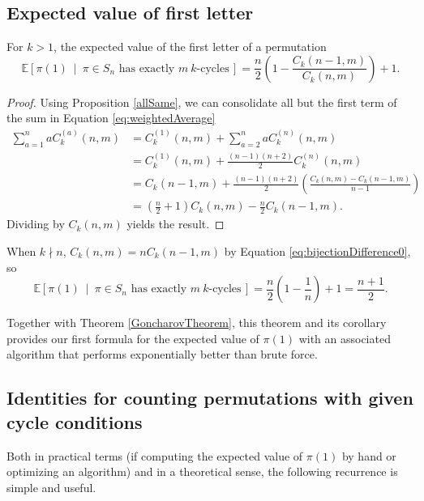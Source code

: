 \subsection{Expected value of first letter}
\begin{theorem}
  \label{firstTheorem}
  For $k > 1$, the expected value of the first letter of a permutation
  \begin{equation}
    \mathbb E[\pi(1)\ \mid\ \pi \in S_n \text{ has exactly } m\ k\text{-cycles}\,]
    = \frac n2\left(1 - \frac{C_k(n-1,m)}{C_k(n,m)}\right) + 1.
  \end{equation}
\end{theorem}
\begin{proof}
  Using Proposition \ref{allSame}, we can consolidate all but the first term of
  the sum in Equation \eqref{eq:weightedAverage} \begin{align}
    \sum_{a = 1}^n aC_k^{(a)}(n, m)
      &= C_k^{(1)}(n,m) + \sum_{a = 2}^n aC_k^{(n)}(n, m) \\
      &= C_k^{(1)}(n,m) + \frac{(n-1)(n+2)}{2} C_k^{(n)}(n, m) \\
      &=
    C_k(n-1,m) + \frac{(n-1)(n+2)}{2}\left(
      \frac{C_k(n, m) - C_k(n-1, m)}{n - 1}
    \right) \\
      &= \left(\frac{n}{2} + 1\right) C_k(n,m) - \frac n2C_k(n-1,m).
  \end{align}
  Dividing by $C_k(n,m)$ yields the result.
\end{proof}
\begin{corollary}
  \label{cor:kNotDivideN}
  When $k \nmid n$, $C_k(n,m) = nC_k(n-1,m)$ by Equation \eqref{eq:bijectionDifference0},
  so \begin{equation}
    \mathbb E[\pi(1)\ \mid\ \pi \in S_n \text{ has exactly } m\ k\text{-cycles}\,] = \frac{n}{2}\left(1 - \frac{1}{n}\right) + 1 = \frac{n+1}{2}.
  \end{equation}
\end{corollary}
Together with Theorem \ref{GoncharovTheorem}, this theorem and its corollary
provides our first formula for the expected value of $\pi(1)$ with an associated
algorithm that performs exponentially better than brute force.

\subsection{Identities for counting permutations with given cycle conditions}
Both in practical terms (if computing the expected value of $\pi(1)$ by hand or
optimizing an algorithm) and in a theoretical sense, the following recurrence is
simple and useful.

